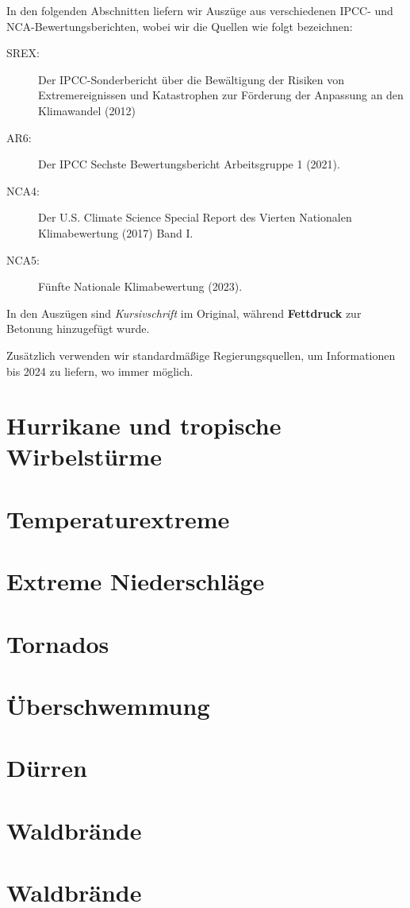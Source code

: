 \documentclass[12pt,paper=a4,DIV=12,parskip=never,chapterprefix=false,headings=standardclasses]{scrreprt}
\begin{document}
In den folgenden Abschnitten liefern wir Auszüge aus verschiedenen IPCC- und NCA-Bewertungsberichten, wobei wir die Quellen wie folgt bezeichnen:
\begin{description}
\item[SREX:] Der IPCC-Sonderbericht über die Bewältigung der Risiken von Extremereignissen und Katastrophen zur Förderung der Anpassung an den Klimawandel (2012)
\item[AR6:] Der IPCC Sechste Bewertungsbericht Arbeitsgruppe 1 (2021). 
\item[NCA4:] Der U.S. Climate Science Special Report des Vierten Nationalen Klimabewertung (2017) Band I.
\item[NCA5:] Fünfte Nationale Klimabewertung (2023).
\end{description}

In den Auszügen sind \emph{Kursivschrift} im Original, während \textbf{Fettdruck} zur Betonung hinzugefügt wurde.

Zusätzlich verwenden wir standardmäßige Regierungsquellen, um Informationen bis 2024 zu liefern, wo immer möglich.

\section{Hurrikane und tropische Wirbelstürme}
\section{Temperaturextreme}
\section{Extreme Niederschläge}
\section{Tornados}
\section{Überschwemmung}
\section{Dürren}
\section{Waldbrände}
\section{Waldbrände}
\end{document}
